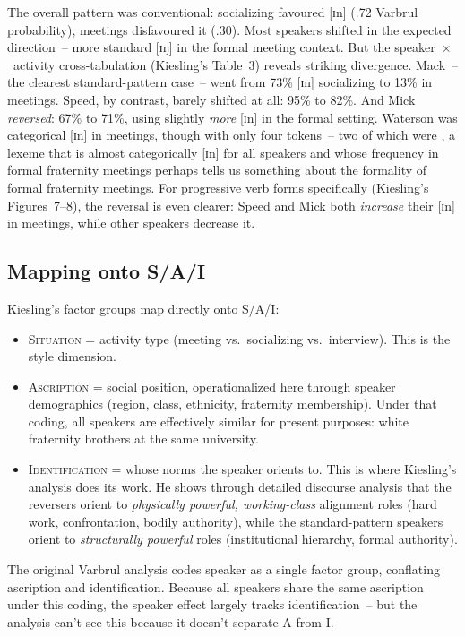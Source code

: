 \documentclass[11pt,letterpaper]{article}
\begin{document}
The overall pattern was conventional: socializing favoured [ɪn] (.72 Varbrul probability), meetings disfavoured it (.30). Most speakers shifted in the expected direction~-- more standard [ɪŋ] in the formal meeting context. But the speaker~$\times$~activity cross-tabulation (Kiesling's Table~3) reveals striking divergence. Mack~-- the clearest standard-pattern case~-- went from 73\% [ɪn] socializing to 13\% in meetings. Speed, by contrast, barely shifted at all: 95\% to 82\%. And Mick \emph{reversed}: 67\% to 71\%, using slightly \emph{more} [ɪn] in the formal setting. Waterson was categorical [ɪn] in meetings, though with only four tokens~-- two of which were , a lexeme that is almost categorically [ɪn] for all speakers and whose frequency in formal fraternity meetings perhaps tells us something about the formality of formal fraternity meetings. For progressive verb forms specifically (Kiesling's Figures~7--8), the reversal is even clearer: Speed and Mick both \emph{increase} their [ɪn] in meetings, while other speakers decrease it.

\subsection{Mapping onto S/A/I}

Kiesling's factor groups map directly onto S/A/I:

\begin{itemize}
    \item \textsc{Situation} = activity type (meeting vs.\ socializing vs.\ interview). This is the style dimension.
    \item \textsc{Ascription} = social position, operationalized here through speaker demographics (region, class, ethnicity, fraternity membership). Under that coding, all speakers are effectively similar for present purposes: white fraternity brothers at the same university.
    \item \textsc{Identification} = whose norms the speaker orients to. This is where Kiesling's analysis does its work. He shows through detailed discourse analysis that the reversers orient to \emph{physically powerful, working-class} alignment roles (hard work, confrontation, bodily authority), while the standard-pattern speakers orient to \emph{structurally powerful} roles (institutional hierarchy, formal authority).
\end{itemize}

The original Varbrul analysis codes speaker as a single factor group, conflating ascription and identification. Because all speakers share the same ascription under this coding, the speaker effect largely tracks identification~-- but the analysis can't see this because it doesn't separate A from I.
\end{document}
